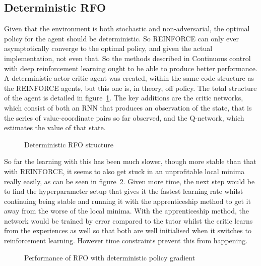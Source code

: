 \subsection{Deterministic RFO}
\label{sec:detrfo}
Given that the environment is both stochastic and non-adversarial, the optimal policy for the agent should be deterministic. So REINFORCE can only ever asymptotically converge to the optimal policy, and given the actual implementation, not even that. So the methods described in Continuous control with deep reinforcement learning\cite{lillicrap2015continuous} ought to be able to produce better performance. A deterministic actor critic agent was created, within the same code structure as the REINFORCE agents, but this one is, in theory, off policy. The total structure of the agent is detailed in figure~\ref{fig:detrfo}. The key additions are the critic networks, which consist of both an RNN that produces an observation of the state, that is the series of value-coordinate pairs so far observed, and the Q-network, which estimates the value of that state.
\begin{figure}
\centering

\caption{Deterministic RFO structure}
\label{fig:detrfo}
\end{figure}

So far the learning with this has been much slower, though more stable than that with REINFORCE, it seems to also get stuck in an unprofitable local minima really easily, as can be seen in figure~\ref{fig:detpolgrad}. Given more time, the next step would be to find the hyperparameter setup that gives it the fastest learning rate whilst continuing being stable and running it with the apprenticeship method to get it away from the worse of the local minima. With the apprenticeship method, the network would be trained by error compared to the tutor whilst the critic learns from the experiences as well so that both are well initialised when it switches to reinforcement learning. However time constraints prevent this from happening.

\begin{figure}
\centering

\caption{Performance of RFO with deterministic policy gradient}
\label{fig:detpolgrad}
\end{figure}

